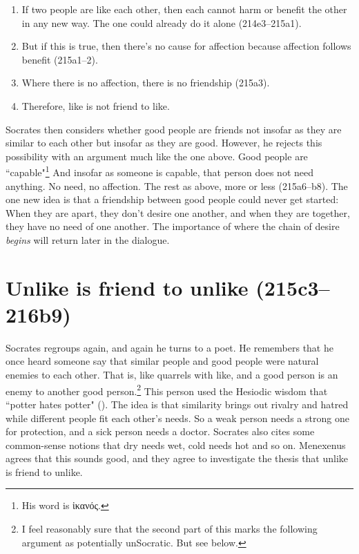 \documentclass[11pt]{article}
\begin{document}
\begin{enumerate}
    \item If two people are like each other, then each cannot harm or benefit the other in any new way.  The one could already do it alone (214e3--215a1).
    \item But if this is true, then there's no cause for affection because affection follows benefit (215a1--2).
    \item Where there is no affection, there is no friendship (215a3).
    \item Therefore, like is not friend to like.
\end{enumerate}

Socrates then considers whether good people are friends not insofar as they are similar to each other but insofar as they are good.  However, he rejects this possibility with an argument much like the one above.  Good people are ``capable"\footnote{His word is {\g ἱκανός}.}  And insofar as someone is capable, that person does not need anything.  No need, no affection.  The rest as above, more or less (215a6--b8).  The one new idea is that a friendship between good people could never get started: When they are apart, they don't desire one another, and when they are together, they have no need of one another.  The importance of where the chain of desire \emph{begins} will return later in the dialogue.


\section{Unlike is friend to unlike (215c3--216b9)}

Socrates regroups again, and again he turns to a poet.  He remembers that he once heard someone say that similar people and good people were natural enemies to each other.  That is, like quarrels with like, and a good person is an enemy to another good person.\footnote{I feel reasonably sure that the second part of this marks the following argument as potentially unSocratic.  But see below.}  This person used the Hesiodic wisdom that ``potter hates potter" ().  The idea is that similarity brings out rivalry and hatred while different people fit each other's needs.  So a weak person needs a strong one for protection, and a sick person needs a doctor.  Socrates also cites some common-sense notions that dry needs wet, cold needs hot and so on.  Menexenus agrees that this sounds good, and they agree to investigate the thesis that unlike is friend to unlike.
\end{document}
